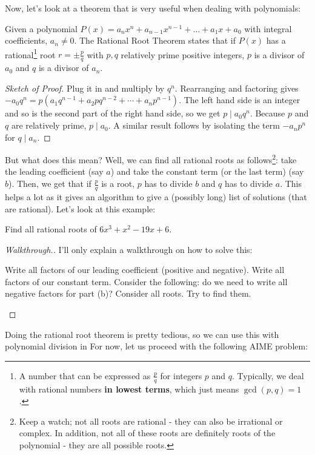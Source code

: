 \documentclass[11pt,titlepage]{scrartcl}
\begin{document}
Now, let's look at a theorem that is very useful when dealing with polynomials:
\begin{theorem}\label{rrthm}
Given a polynomial $P(x) = a_n x^n + a_{n - 1}x^{n - 1} + \ldots + a_1 x + a_0$ with integral coefficients, $a_n \neq 0$. The Rational Root Theorem states that if $P(x)$ has a rational\footnote{A number that can be expressed as $\tfrac pq$ for integers $p$ and $q$. Typically, we deal with rational numbers \textbf{in lowest terms}, which just means $\gcd(p,q)=1$.} root $r = \pm\frac pq$ with $p, q$ relatively prime positive integers, $p$ is a divisor of $a_0$ and $q$ is a divisor of $a_n$.
\end{theorem}
\begin{proof}[Sketch of Proof]
Plug it in and multiply by $q^n$. Rearranging and factoring gives $-a_0q^n=p(a_1q^{n-1}+a_2pq^{n-2}+\cdots+a_np^{n-1})$. The left hand side is an integer and so is the second part of the right hand side, so we get $p\mid a_0q^n$. Because $p$ and $q$ are relatively prime,  $p\mid a_0$. A similar result follows by isolating the term  $-a_np^n$ for $q\mid a_n$.
\end{proof}
But what does this mean? Well, we can find all rational roots as follows\footnote{Keep a watch; not all roots are rational - they can also be irrational or complex. In addition, not all of these roots are definitely roots of the polynomial - they are all possible roots.}: take the leading coefficient (say $a$) and take the constant term (or the last term) (say $b$). Then, we get that if $\tfrac pq$ is a root, $p$ has to divide $b$ and $q$ has to divide $a$. This helps a lot as it gives an algorithm to give a (possibly long) list of solutions (that are rational). Let's look at this example:
\begin{example}[naman12]
Find all rational roots of $6 x^3 + x^2 - 19 x + 6$.
\end{example}
\begin{proof}[Walkthrough.]
I'll only explain a walkthrough on how to solve this:
\begin{enumerate}[(a)]
    \ii Write all factors of our leading coefficient (positive and negative).
    \ii Write all factors of our constant term.
    \ii Consider the following: do we need to write all negative factors for part (b)?
    \ii Consider all roots. Try to find them.
\end{enumerate}
\end{proof}
Doing the rational root theorem is pretty tedious, so we can use this with polynomial division in  For now, let us proceed with the following AIME problem:
\end{document}
